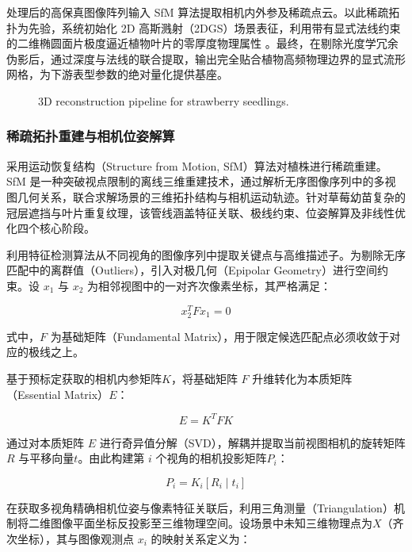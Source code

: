 \documentclass[preprint,12pt]{elsarticle}
\begin{document}
处理后的高保真图像阵列输入 SfM 算法提取相机内外参及稀疏点云。以此稀疏拓扑为先验，系统初始化 2D 高斯溅射（2DGS）场景表征，利用带有显式法线约束的二维椭圆面片极度逼近植物叶片的零厚度物理属性 。最终，在剔除光度学冗余伪影后，通过深度与法线的联合提取，输出完全贴合植物高频物理边界的显式流形网格，为下游表型参数的绝对量化提供基座。

\begin{figure}[t]
\centering
\caption{3D reconstruction pipeline for strawberry seedlings.}
\label{fig:image11}
\end{figure}

\subsubsection{稀疏拓扑重建与相机位姿解算}

采用运动恢复结构（Structure from Motion, SfM）算法对植株进行稀疏重建。SfM 是一种突破视点限制的离线三维重建技术，通过解析无序图像序列中的多视图几何关系，联合求解场景的三维拓扑结构与相机运动轨迹。针对草莓幼苗复杂的冠层遮挡与叶片重复纹理，该管线涵盖特征关联、极线约束、位姿解算及非线性优化四个核心阶段。

利用特征检测算法从不同视角的图像序列中提取关键点与高维描述子。为剔除无序匹配中的离群值（Outliers），引入对极几何（Epipolar Geometry）进行空间约束。设 ${x}_{1}$ 与 ${x}_{2}$ 为相邻视图中的一对齐次像素坐标，其严格满足：

\begin{equation}
{x}_{2}^{T}F{x}_{1}=0
\end{equation}

式中，$F$ 为基础矩阵（Fundamental Matrix），用于限定候选匹配点必须收敛于对应的极线之上。

基于预标定获取的相机内参矩阵$K$，将基础矩阵 $F$ 升维转化为本质矩阵（Essential Matrix）$E$：

\begin{equation}
E={K}^{T} F K
\end{equation}

通过对本质矩阵 $E$ 进行奇异值分解（SVD），解耦并提取当前视图相机的旋转矩阵 $R$ 与平移向量$t$。由此构建第 $i$ 个视角的相机投影矩阵${P}_{i}$：

\begin{equation}
{P}_{i}={K}_{i}\left[{R}_{i}\mid {t}_{i}\right]
\end{equation}

在获取多视角精确相机位姿与像素特征关联后，利用三角测量（Triangulation）机制将二维图像平面坐标反投影至三维物理空间。设场景中未知三维物理点为$X$（齐次坐标），其与图像观测点 ${x}_{i}$ 的映射关系定义为：
\end{document}
